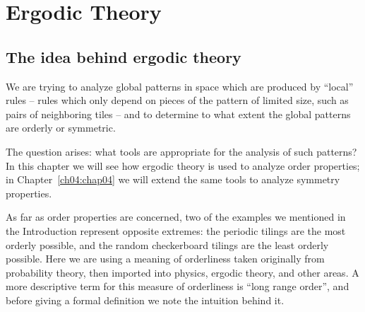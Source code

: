 \documentclass[reqno]{stml-l}
\theoremstyle{plain}
\theoremstyle{definition}
\numberwithin{equation}{chapter}
\begin{document}
\chapter{Ergodic Theory}\label{ch01:chap01}

\section{The idea behind ergodic theory}\label{ch01:sec1}

We are trying to analyze global patterns in space which are
produced by ``local'' rules -- rules which only depend on
pieces of the pattern of limited size, such as pairs of
neighboring tiles -- and to determine to what extent the
global patterns are orderly or symmetric.

The question arises: what tools are appropriate for the
analysis of such patterns? In this chapter we will see how
ergodic theory is used to analyze order properties; in
Chapter~\ref{ch04:chap04} we will extend the same tools to
analyze symmetry properties.

As far as order properties are concerned, two of the
examples we mentioned in the Introduction represent
opposite extremes: the periodic tilings are the most
orderly possible, and the random checkerboard tilings are
the least orderly possible. Here we are using a meaning of
orderliness taken originally from probability theory, then
imported into physics, ergodic theory, and other areas. A
more descriptive term for this measure of orderliness is
``long range order'', and
before giving a formal definition we note the intuition
behind it.
\end{document}
